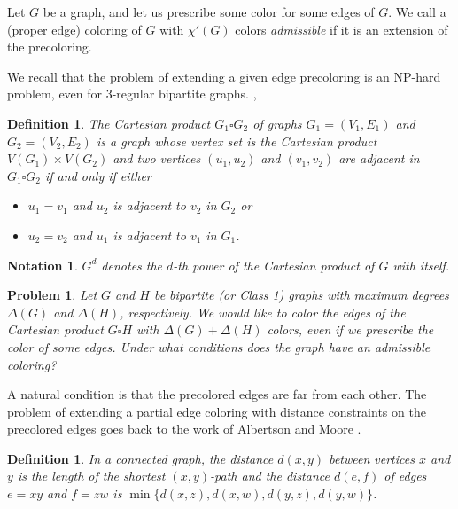 \documentclass[a4paper,12pt]{article}
\newtheorem{problem}[theorem]{\bf Problem}
\newtheorem{nota}[theorem]{\bf Notation}
\newtheorem{defi}[theorem]{\bf Definition}
\begin{document}
Let $G$ be a graph, and let us prescribe some color for some edges of $G$. We call a (proper edge) coloring of $G$ with $\chi'(G)$ colors \textit{admissible} if it is an extension of the precoloring.

We recall that the problem of extending a given edge precoloring is an NP-hard problem, even for 3-regular bipartite graphs. \cite{Easton}, \cite{Fiala}

\begin{defi}
    \textup{The \textit{Cartesian product $G_1 \square G_2$ of graphs} $G_1=(V_1,E_1)$ and $G_2=(V_2,E_2)$ is a graph whose vertex set is the Cartesian product $V(G_1) \times V(G_2)$ and two vertices $(u_1,u_2)$ and $(v_1,v_2)$ are adjacent in $G_1 \square G_2$ if and only if either}
    \begin{itemize}
        \item \textup{$u_1=v_1$ and $u_2$ is adjacent to $v_2$ in $G_2$ or}
        \item \textup{$u_2=v_2$ and $u_1$ is adjacent to $v_1$ in $G_1$.}
    \end{itemize}
\end{defi}

\begin{nota}
    \textup{$G^d$ denotes the $d$-th power of the Cartesian product of $G$ with itself.}
\end{nota}

\begin{problem} \label{problem}
    Let $G$ and $H$ be bipartite (or Class 1) graphs with maximum degrees $\Delta(G)$ and $\Delta(H)$, respectively. We would like to color the edges of the Cartesian product $G \square H$ with $\Delta(G) + \Delta(H)$ colors, even if we prescribe the color of some edges. Under what conditions does the graph have an admissible coloring?
\end{problem}

A natural condition is that the precolored edges are far from each other. The problem of extending a partial edge coloring with distance constraints on the precolored edges goes back to the work of Albertson and Moore \cite{Albertson}.

\begin{defi}
    \textup{In a connected graph, the \textit{distance $d(x,y)$ between vertices} $x$ and $y$ is the length of the shortest $(x,y)$-path and the \textit{distance $d(e,f)$ of edges} $e=xy$ and $f=zw$ is $\min \{d(x,z),d(x,w),d(y,z),d(y,w) \}$.}
\end{defi}
\end{document}
